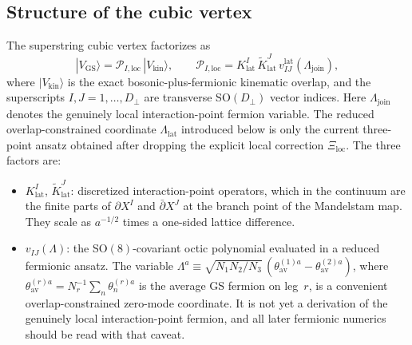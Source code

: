\documentclass[11pt]{article}
\newcommand{\perpD}{D_\perp}
\begin{document}
\subsection{Structure of the cubic vertex}

The superstring cubic vertex factorizes as
\begin{equation}
|V_{\mathrm{GS}}\rangle = \mathcal{P}_{I,\mathrm{loc}}\,|V_{\mathrm{kin}}\rangle,
\qquad
\mathcal{P}_{I,\mathrm{loc}} = K_{\mathrm{lat}}^I\,\widetilde K_{\mathrm{lat}}^J\,v_{IJ}^{\mathrm{lat}}(\Lambda_{\mathrm{join}}),
\label{eq:vgs}
\end{equation}
where $|V_{\mathrm{kin}}\rangle$ is the exact bosonic-plus-fermionic kinematic overlap, and the superscripts $I, J = 1, \dots, \perpD$ are transverse SO$(\perpD)$ vector indices. Here $\Lambda_{\mathrm{join}}$ denotes the genuinely local interaction-point fermion variable. The reduced overlap-constrained coordinate $\Lambda_{\mathrm{lat}}$ introduced below is only the current three-point ansatz obtained after dropping the explicit local correction $\Xi_{\mathrm{loc}}$. The three factors are:

\begin{itemize}
\item $K_{\mathrm{lat}}^I$, $\widetilde K_{\mathrm{lat}}^J$: discretized interaction-point operators, which in the continuum are the finite parts of $\partial X^I$ and $\bar\partial X^J$ at the branch point of the Mandelstam map. They scale as $a^{-1/2}$ times a one-sided lattice difference.

\item $v_{IJ}(\Lambda)$: the SO$(8)$-covariant octic polynomial evaluated in a reduced fermionic ansatz. The variable $\Lambda^a \equiv \sqrt{N_1 N_2/N_3}\,(\theta_{\mathrm{av}}^{(1)a} - \theta_{\mathrm{av}}^{(2)a})$, where $\theta_{\mathrm{av}}^{(r)a} = N_r^{-1}\sum_n \theta_n^{(r)a}$ is the average GS fermion on leg~$r$, is a convenient overlap-constrained zero-mode coordinate. It is not yet a derivation of the genuinely local interaction-point fermion, and all later fermionic numerics should be read with that caveat.
\end{itemize}
\end{document}
